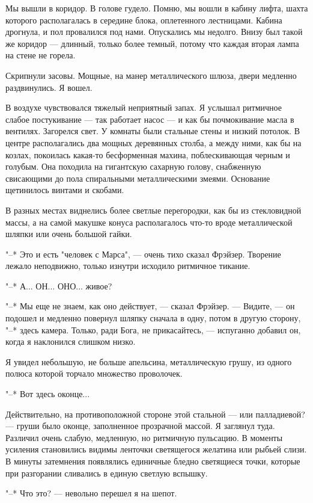 Мы вышли в коридор. В голове гудело. Помню, мы вошли  в  кабину  лифта,
шахта которого располагалась в  середине  блока,  оплетенного  лестницами.
Кабина дрогнула, и пол провалился под нами. Опускались мы  недолго.  Внизу
был такой же коридор --- длинный, только более  темный,  потому  что  каждая
вторая лампа на стене не горела.

Скрипнули засовы. Мощные, на манер металлического шлюза, двери медленно
раздвинулись. Я вошел.

В воздухе чувствовался тяжелый неприятный запах.  Я  услышал  ритмичное
слабое постукивание --- так работает насос --- и как бы почмокивание  масла  в
вентилях. Загорелся свет. У комнаты были стальные стены и низкий  потолок.
В центре располагались два мощных деревянных столба, а между ними, как  бы
на козлах, покоилась какая-то бесформенная махина, поблескивающая черным и
голубым. Она походила на гигантскую сахарную голову, снабженную свисающими
до пола спиральными металлическими змеями. Основание щетинилось винтами  и
скобами.

В  разных  местах  виднелись  более  светлые  перегородки,  как  бы  из
стекловидной массы, а на самой макушке конуса располагалось  что-то  вроде
металлической шляпки или очень большой гайки.

"--* Это и есть "человек с Марса", --- очень тихо сказал  Фрэйзер.  Творение
лежало неподвижно, только изнутри исходило ритмичное тикание.

"--* А... ОН... ОНО... живое?

"--* Мы еще не знаем, как оно действует, --- сказал Фрэйзер. --- Видите, ---  он
подошел и медленно повернул шляпку сначала в одну, потом в другую сторону,
"--* здесь камера. Только, ради Бога, не прикасайтесь,  ---  испуганно  добавил
он, когда я наклонился слишком низко.

Я увидел небольшую, не больше апельсина, металлическую грушу, из одного
полюса которой торчало множество проволочек.

"--* Вот здесь оконце...

Действительно,  на  противоположной  стороне  этой   стальной   ---   или
палладиевой?  ---  груши  было  оконце,  заполненное  прозрачной  массой.  Я
заглянул туда. Различил очень слабую, медленную, но ритмичную пульсацию. В
моменты усиления становились  видимы  ленточки  светящегося  желатина  или
рыбьей слизи. В минуты затемнения появлялись единичные  бледно  светящиеся
точки, которые при разгорании сливались в единую светлую вспышку.

"--* Что это? --- невольно перешел я на шепот.

